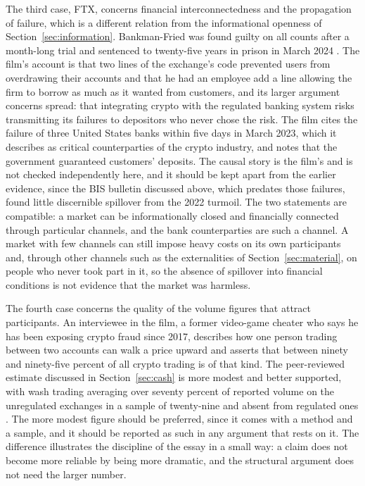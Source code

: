 \documentclass[11pt]{article}
\theoremstyle{remark}
\begin{document}
The third case, FTX, concerns financial interconnectedness and the propagation of failure, which is a different relation from the informational openness of Section~\ref{sec:information}. Bankman-Fried was found guilty on all counts after a month-long trial and sentenced to twenty-five years in prison in March 2024 \cite{nbc2025,mckenzie2026}. The film's account is that two lines of the exchange's code prevented users from overdrawing their accounts and that he had an employee add a line allowing the firm to borrow as much as it wanted from customers, and its larger argument concerns spread: that integrating crypto with the regulated banking system risks transmitting its failures to depositors who never chose the risk. The film cites the failure of three United States banks within five days in March 2023, which it describes as critical counterparties of the crypto industry, and notes that the government guaranteed customers' deposits. The causal story is the film's and is not checked independently here, and it should be kept apart from the earlier evidence, since the BIS bulletin discussed above, which predates those failures, found little discernible spillover from the 2022 turmoil. The two statements are compatible: a market can be informationally closed and financially connected through particular channels, and the bank counterparties are such a channel. A market with few channels can still impose heavy costs on its own participants and, through other channels such as the externalities of Section~\ref{sec:material}, on people who never took part in it, so the absence of spillover into financial conditions is not evidence that the market was harmless.

The fourth case concerns the quality of the volume figures that attract participants. An interviewee in the film, a former video-game cheater who says he has been exposing crypto fraud since 2017, describes how one person trading between two accounts can walk a price upward and asserts that between ninety and ninety-five percent of all crypto trading is of that kind. The peer-reviewed estimate discussed in Section~\ref{sec:cash} is more modest and better supported, with wash trading averaging over seventy percent of reported volume on the unregulated exchanges in a sample of twenty-nine and absent from regulated ones \cite{cong2022}. The more modest figure should be preferred, since it comes with a method and a sample, and it should be reported as such in any argument that rests on it. The difference illustrates the discipline of the essay in a small way: a claim does not become more reliable by being more dramatic, and the structural argument does not need the larger number.
\end{document}

